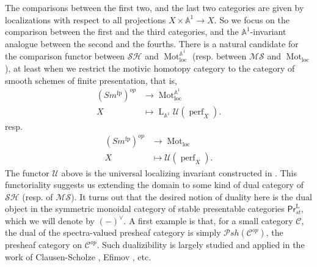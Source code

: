 \documentclass{article}
\theoremstyle{definition}
\newcommand{\on}{\operatorname}
\newcommand{\PrL}{\mathsf{Pr}^\mathrm{L} }
\begin{document}
The comparisons between the first two, and the last two categories are given by localizations with respect to all projections $X\times\mathbb{A}^1\rightarrow X$. So we focus on the comparison between the first and the third categories, and the $\mathbb{A}^1$-invariant analogue between the second and the fourths. There is a natural candidate for the comparison functor between $\mathcal{SH}$ and $\on{Mot}_{\on{loc}}^{\mathbb{A}^1}$ (resp. between $\mathcal{MS}$ and $\on{Mot}_{\on{loc}}$), at least when we restrict the motivic homotopy category to the category of smooth schemes of finite presentation, that is,
\[\begin{aligned}
(Sm^{\on{fp}})^{op}&\rightarrow\on{Mot}_{\on{loc}}^{\mathbb{A}^1}\\
X&\mapsto\on{L}_{\mathbb{A}^1}\mathcal{U}(\on{perf}_X).
\end{aligned}\]
resp.\[\begin{aligned}
(Sm^{\on{fp}})^{op}&\rightarrow\on{Mot}_{\on{loc}}\\
X&\mapsto\mathcal{U}(\on{perf}_X).
\end{aligned}\]
The functor $\mathcal{U}$ above is the universal localizing invariant constructed in \cite{BGT}. This functoriality suggests us extending the domain to some kind of dual category of $\mathcal{SH}$ (resp. of $\mathcal{MS}$). It turns out that the desired notion of duality here is the dual object in the symmetric monoidal category of stable presentable categories $\PrL_{st}$, which we will denote by $(-)^\vee$. A first example is that, for a small category $\mathcal{C}$, the dual of the spectra-valued presheaf category is simply $\mathcal{P}sh(\mathcal{C}^{op})$, the presheaf category on $\mathcal{C}^{op}$. Such dualizibility is largely studied and applied in the work of Clausen-Scholze \cite{CS}, Efimov \cite{Efi}, etc.
\end{document}
